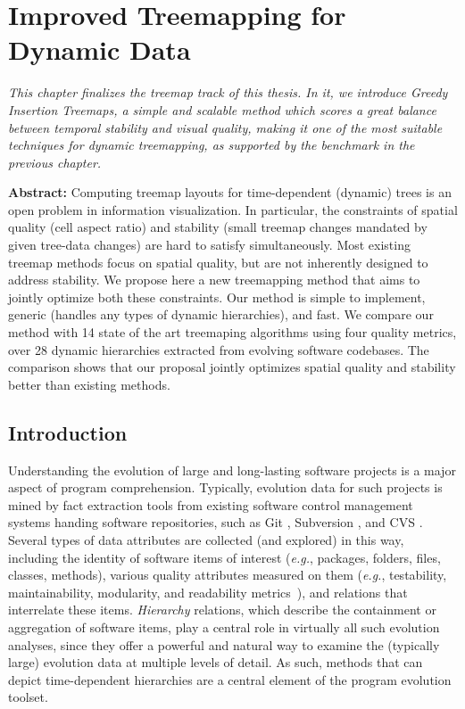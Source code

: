 \chapter{Improved Treemapping for Dynamic Data}


\textit{
This chapter finalizes the treemap track of this thesis. In it, we introduce \emph{Greedy Insertion Treemaps}, a simple and scalable method which scores a great balance between temporal stability and visual quality, making it one of the most suitable techniques for dynamic treemapping, as supported by the benchmark in the previous chapter.
}

\vspace{5mm} %

\noindent \textbf{Abstract:}
Computing treemap layouts for time-dependent (dynamic) trees is an open problem in information visualization. In particular, the constraints of spatial quality (cell aspect ratio) and stability (small treemap changes mandated by given tree-data changes) are hard to satisfy simultaneously. Most existing treemap methods focus on spatial quality, but are not inherently designed to address stability. We propose here a new treemapping method that aims to jointly optimize both these constraints. Our method is simple to implement, generic (handles any types of dynamic hierarchies), and fast. We compare our method with 14 state of the art treemaping algorithms using four quality metrics, over 28 dynamic hierarchies extracted from evolving software codebases. The comparison shows that our proposal jointly optimizes spatial quality and stability better than existing methods.


\section{Introduction} \label{sec:intro}
%
%
Understanding the evolution of large and long-lasting software projects is a major aspect of program comprehension. Typically, evolution data for such projects is mined by fact extraction tools from existing software control management systems handing software repositories, such as Git \citep{git}, Subversion \citep{subversion}, and CVS \citep{cvs}.
Several types of data attributes are collected (and explored) in this way, including the identity of software items of interest (\emph{e.g.}, packages, folders, files, classes, methods), various quality attributes measured on them (\emph{e.g.}, testability, maintainability, modularity, and readability metrics~\citep{lanza06}), and relations that interrelate these items. \emph{Hierarchy} relations, which describe the containment or aggregation of software items, play a central role in virtually all such evolution analyses, since they offer a powerful and natural way to examine the (typically large) evolution data at multiple levels of detail. As such, methods that can depict time-dependent hierarchies are a central element of the program evolution toolset.

